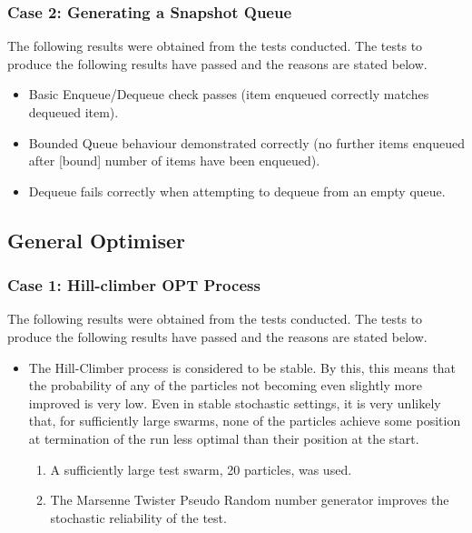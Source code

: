 \documentclass[11pt]{article}
\begin{document}
\subsubsection{Case 2: Generating a Snapshot Queue}
The following results were obtained from the tests conducted. The tests to produce the
following results have passed and the reasons are stated below.

\begin{itemize}
	\item Basic Enqueue/Dequeue check passes (item enqueued correctly matches dequeued item).
	\item Bounded Queue behaviour demonstrated correctly (no further items enqueued after [bound] number of items have been enqueued).
	\item Dequeue fails correctly when attempting to dequeue from an empty queue.
\end{itemize}

\subsection{General Optimiser}
\subsubsection{Case 1: Hill-climber OPT Process}
The following results were obtained from the tests conducted. The tests to produce the
following results have passed and the reasons are stated below.

\begin{itemize}
	\item The Hill-Climber process is considered to be stable. By this, this means that the probability of any of the particles not becoming even slightly more improved is very low. Even in stable stochastic settings, it is very unlikely that, for sufficiently large swarms, none of the particles achieve some position at termination of the run less optimal than their position at the start.
	\begin{enumerate}
		\item A sufficiently large test swarm, 20 particles, was used.
	\item The Marsenne Twister Pseudo Random number generator improves the stochastic reliability of the test.
	
	\end{enumerate}
\end{itemize}
\end{document}
